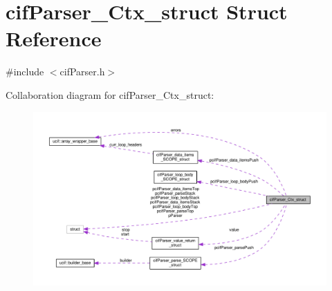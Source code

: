 \hypertarget{structcif_parser___ctx__struct}{\section{cif\-Parser\-\_\-\-Ctx\-\_\-struct Struct Reference}
\label{structcif_parser___ctx__struct}
}


{\ttfamily \#include $<$cif\-Parser.\-h$>$}



Collaboration diagram for cif\-Parser\-\_\-\-Ctx\-\_\-struct\-:
\nopagebreak
\begin{figure}[H]
\begin{center}
\leavevmode
\includegraphics[width=350pt]{structcif_parser___ctx__struct__coll__graph}
\end{center}
\end{figure}
